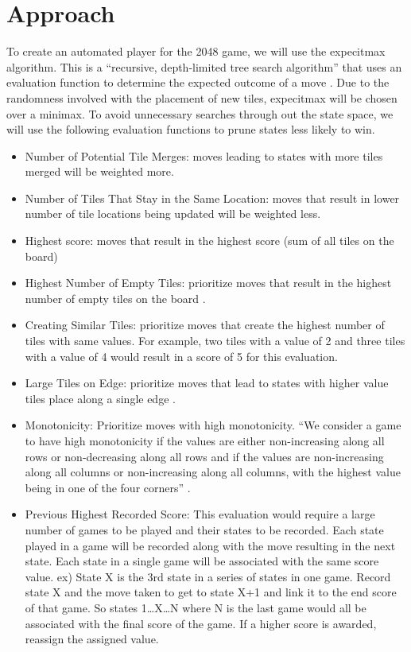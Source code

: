 \documentclass{article}
\begin{document}
\section*{Approach}
To create an automated player for the 2048 game, we will use the expecitmax algorithm. This is a  “recursive, depth-limited tree search algorithm” that uses an evaluation function to determine the expected outcome of a move \cite{rodgers_levine2014}. Due to the randomness involved with the placement of new tiles, expecitmax will be chosen over a minimax. To avoid unnecessary searches through out the state space, we will use the following evaluation functions to prune states less likely to win.
\begin{itemize}
    \item Number of Potential Tile Merges: moves leading to states with more tiles merged will be weighted more.

    \item Number of Tiles That Stay in the Same Location: moves that result in lower number of tile locations being updated will be weighted less.

    \item Highest score: moves that result in the highest score (sum of all tiles on the board)
    
    \item Highest Number of Empty Tiles: prioritize moves that result in the highest number of empty tiles on the board \cite{kohler_migler_khosmood}.

    \item Creating Similar Tiles: prioritize moves that create the highest number of tiles with same values. For example, two tiles with a value of 2 and three tiles with a value of 4 would result in a score of 5 for this evaluation.

    \item Large Tiles on Edge: prioritize moves that lead to states with higher value tiles place along a single edge \cite{stack_optimal_alg_20248}. 

    \item Monotonicity: Prioritize moves with high monotonicity. “We consider a game to have high monotonicity if the values are either non-increasing along all rows or non-decreasing along all rows and if the values are non-increasing along all columns or non-increasing along all columns, with the highest value being in one of the four corners” \cite{kohler_migler_khosmood} \cite{stack_optimal_alg_20248}. 

    \item Previous Highest Recorded Score: This evaluation would require a large number of games to be played and their states to be recorded. Each state played in a game will be recorded along with the move resulting in the next state. Each state in a single game will be associated with the same score value. 
ex) State X is the 3rd state in a series of states in one game. Record state X and the move taken to get to state X+1 and link it to the end score of that game. So states 1…X…N where N is the last game would all be associated with the final score of the game. If a higher score is awarded, reassign the assigned value.
\end{itemize}
\end{document}
